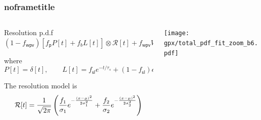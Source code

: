 \documentclass[aspectratio=169,9pt,handout]{beamer}
\newcommand{\pdfnote}[1]{}
\begin{document}
\begin{frame}[default] %
\frametitle{noframetitle}
  \begin{columns}
    \begin{column}{0.45\textwidth}
      \begin{block}{Resolution p.d.f}
        \centering $ (1-f_{\mathsf{wpv}})
        \left[ f_{\mathsf{p}} P[t] + f_{b} L[t] \right] 
        \otimes \mathcal{R}[t] + f_{\mathsf{wpv}} W[t] $
      \end{block}
      \bigskip
      where
      $$ P[t] = \delta[t], \qquad L[t] = f_{\mathsf{sl}} e^{- t / \tau_s} + (1 - f_{\mathsf{sl}}) e^{- t / \tau_{\mathsf{l}}} .$$
      
      \bigskip
      The resolution model is 
      $$ \small \mathcal{R}[t] = \frac{1}{\sqrt{2\pi}} \left( \frac{f_1}{\sigma_1} e^{-\frac{(x-\mu)^2}{2 \sigma_1^2}} + \frac{f_2}{\sigma_2} e^{-\frac{(x-\mu)^2}{2 \sigma_2^2}}\right)$$
      
    \end{column}
    \begin{column}{0.45\textwidth}
      \texttt{[image: gpx/total\_pdf\_fit\_zoom\_b6.pdf]}
    \end{column}
  \end{columns}

\pdfnote{Putting everythin toguether we have the resolution pdf}
\pdfnote{In the right side, we can see all the components involved in the extraction of the resolution. this picture corresponds to 2017 at the 6th bin}

\end{frame} %
  
  
\end{document}
